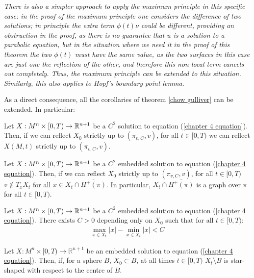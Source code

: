 \begin{oss}\em
	There is also a simpler approach to apply the maximum principle in this specific case: in the proof of the maximum principle one considers the difference of two solutions; in principle the extra term $\phi(t) \nu$ could be different, providing an obstruction in the proof, as there is no guarantee that $u$ is a solution to a parabolic equation, but in the situation where we need it in the proof of this theorem the two $\phi(t)$ must have the same value, as the two surfaces in this case are just one the reflection of the other, and therefore this non-local term cancels out completely. Thus, the maximum principle can be extended to this situation. Similarly, this also applies to Hopf's boundary point lemma. 
\end{oss}

As a direct consequence, all the corollaries of theorem \ref{chow gulliver} can be extended. In particular:


\begin{cor}
	Let $X:M^n\times [0,T) \rightarrow \mathbb{R}^{n+1}$ be a $C^2$ solution to equation (\ref{chapter 4 equation}). Then, if we can reflect $X_0$ strictly up to $(\pi_{v,C},v)$, for all $t\in [0,T)$ we can reflect $X(M, t)$ strictly up to $(\pi_{v,C},v)$. 
\end{cor}

\begin{cor}
	Let $X:M^n\times [0,T) \rightarrow \mathbb{R}^{n+1}$ be a $C^2$ embedded solution to equation (\ref{chapter 4 equation}). Then, if we can reflect $X_0$ strictly up to $(\pi_{v,C},v)$, for all $t\in [0,T)$ $v\notin T_xX_t$ for all $x\in X_t\cap\overline{H^+(\pi)}$. In particular,  $ X_t\cap\overline{H^+(\pi)}$ is a graph over $\pi$ for all $t\in [0,T)$.
\end{cor}


\begin{cor}
	Let $X:M^n\times [0,T) \rightarrow \mathbb{R}^{n+1}$ be a $C^2$ embedded solution to equation (\ref{chapter 4 equation}). There exists $C>0$ depending only on $X_0$ such that for all $t\in[0, T)$: 
	\begin{align*}
		\max_{x\in X_t} |x| - \min_{x\in X_t} |x| < C
	\end{align*}\label{new sandwich estimate}
\end{cor}
 

\begin{cor}
	Let $ X : M^n \times [0, T) \to \mathbb{R}^{n+1} $ be an embedded solution to equation (\ref{chapter 4 equation}). Then, if, for a sphere $B$, $X_0\subset B$, at all times $t \in [0, T)$ $X_t\setminus B$ is star-shaped with respect to the centre of $B$.\label{starshaped ch4}
\end{cor}

